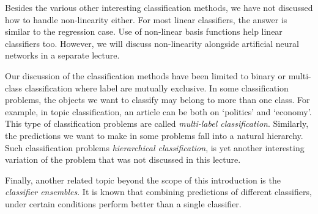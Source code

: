 Besides the various other interesting classification methods,
we have not discussed how to handle non-linearity either.
For most linear classifiers,
the answer is similar to the regression case.
Use of non-linear basis functions help linear classifiers too.
However, we will discuss non-linearity alongside artificial neural networks
in a separate lecture.

Our discussion of the classification methods have been limited
to binary or multi-class classification
where label are mutually exclusive.
In some classification problems,
the objects we want to classify may belong to more than
one class.
For example,
in topic classification,
an article can be both on `politics' and `economy'.
This type of classification problems are called
\emph{multi-label classification}.
Similarly,
the predictions we want to make in some problems
fall into a natural hierarchy.
Such classification problems \emph{hierarchical classification},
is yet another interesting variation of the problem
that was not discussed in this lecture.

Finally, another related topic beyond the scope of this introduction 
is the \emph{classifier ensembles}.
It is known that combining predictions of different classifiers,
under certain conditions perform better than a single classifier.


